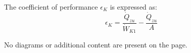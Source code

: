 The coefficient of performance \( \epsilon_K \) is expressed as:  
\[
\epsilon_K = \frac{\dot{Q}_{zu}}{\dot{W}_{K1}} - \frac{\dot{Q}_{zu}}{A}
\]  

No diagrams or additional content are present on the page.